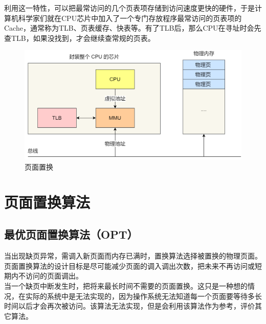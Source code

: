 利用这一特性，可以把最常访问的几个页表项存储到访问速度更快的硬件，于是计算机科学家们就在CPU芯片中加入了一个专门存放程序最常访问的页表项的Cache，通常称为TLB、页表缓存、快表等。有了TLB后，那么CPU在寻址时会先查TLB，如果没找到，才会继续查常规的页表。

\begin{figure}[H]
	\centering
	\includegraphics[scale=0.4]{img/C3/3-5/4.png}
	\caption{页面置换}
\end{figure}

\newpage

\section{页面置换算法}

\subsection{最优页面置换算法（OPT）}

当出现缺页异常，需调入新页面而内存已满时，置换算法选择被置换的物理页面。页面置换算法的设计目标是尽可能减少页面的调入调出次数，把未来不再访问或短期内不访问的页面调出。 \\

当一个缺页中断发生时，把将来最长时间不需要的页面置换。这只是一种想的情况，在实际的系统中是无法实现的，因为操作系统无法知道每一个页面要等待多长时间以后才会再次被访问。该算法无法实现，但是会利用该算法作为参考，评价其它算法。

